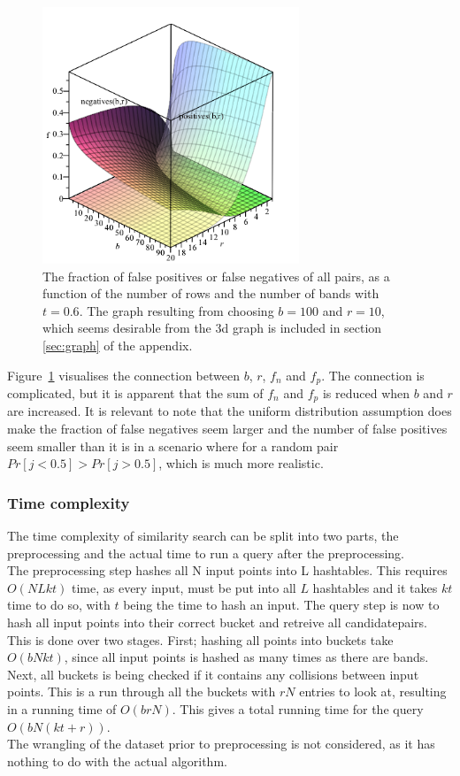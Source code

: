 \begin{figure}[H]
	\centering
	\includegraphics[width=290px]{img/falseGraph.png}
	\caption{The fraction of false positives or false negatives of all pairs, as a function of the number of rows and the number of bands with \(t=0.6\). The graph resulting from choosing \(b = 100\) and \(r = 10\), which seems desirable from the 3d graph is included in section \ref{sec:graph} of the appendix.}
	\label{fig:false_graph}
\end{figure}

Figure~\ref{fig:false_graph} visualises the connection between \(b\), \(r\), \(f_n\) and \(f_p\). The connection is complicated, but it is apparent that the sum of \(f_n\) and \(f_p\) is reduced when \(b\) and \(r\) are increased. It is relevant to note that the uniform distribution assumption does make the fraction of false negatives seem larger and the number of false positives seem smaller than it is in a scenario where for a random pair \(Pr[j<0.5] > Pr[j>0.5]\), which is much more realistic.

\subsubsection{Time complexity}
The time complexity of similarity search can be split into two parts, the preprocessing and the actual time to run a query after the preprocessing.\\
The preprocessing step hashes all N input points into L hashtables. This requires \(O(NLkt)\) time, as every input, must be put into all \(L\) hashtables and it takes \(kt\) time to do so, with \(t\) being the time to hash an input. The query step is 
now to hash all input points into their correct bucket and retreive all candidatepairs. \\
This is done over two stages. First; hashing all points into buckets take \(O(bNkt)\), since all input points is hashed as many times as there are bands. Next, all buckets is being checked if it contains any collisions between input points. This is a run through all the buckets with \(rN\) entries to look at, resulting in a running time of \(O(brN)\). This gives a total running time for the query \(O(bN(kt+r))\). \\
The wrangling of the dataset prior to preprocessing is not considered, as it has nothing to do with the actual algorithm.

